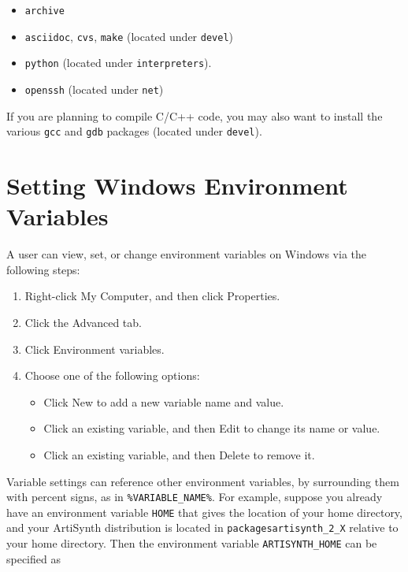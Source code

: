 \documentclass{article}
\begin{document}
\begin{itemize}

\item {\tt archive}
\item {\tt asciidoc}, {\tt cvs}, {\tt make} (located under {\tt devel})
\item {\tt python} (located under {\tt interpreters}).
\item {\tt openssh} (located under {\tt net})

\end{itemize}

If you are planning to compile C/C++ code, you may also want to
install the various {\tt gcc} and {\tt gdb} packages (located under {\tt devel}).

\section{Setting Windows Environment Variables}
\label{settingWindowsVariablesSec}

A user can view, set, or change environment variables on Windows via
the following steps:

\begin{enumerate}

\item Right-click {\sf My Computer}, and then click {\sf Properties}.
\item Click the {\sf Advanced} tab.
\item Click {\sf Environment variables}.
\item Choose one of the following options:

\begin{itemize}

\item Click {\sf New} to add a new variable name and value.
\item Click an existing variable, and then {\sf Edit} to change its name or value.
\item Click an existing variable, and then {\sf Delete} to remove it.

\end{itemize}
\end{enumerate}

Variable settings can reference other environment variables, by
surrounding them with percent signs, as in {\tt \%VARIABLE\_NAME\%}.  For
example, suppose you already have an environment variable {\tt HOME} that
gives the location of your home directory, and your ArtiSynth
distribution is located in {\tt packages\BKS artisynth\_2\_X} relative to your
home directory. Then the environment variable {\tt ARTISYNTH\_HOME} can be
specified as
\end{document}
